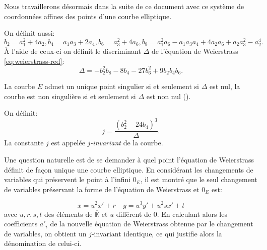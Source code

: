\documentclass[10pt,a4paper]{book}
\theoremstyle{plain}
\theoremstyle{definition}
\theoremstyle{definition}
\theoremstyle{definition}
\theoremstyle{definition}
\theoremstyle{definition}
\newtheorem{defi}[thm]{Définition}
\theoremstyle{remark}
\theoremstyle{remark}
\theoremstyle{definition}
\begin{document}
Nous travaillerons désormais dans la suite de ce document avec ce système de 
coordonnées affines des points d'une courbe elliptique.

 On définit aussi:
\begin{equation*}
b_2=a_1^2+4a_2, b_4=a_1a_3+2a_4, b_6=a_3^2+4a_6, b_8=a_1^2a_6-a_1a_3a_4+4a_2a_6+a_2a_3^2-a_2^4.
\end{equation*}
\`A l'aide de ceux-ci on définit le discriminant $\Delta$ de l'équation de Weierstrass \eqref{eq:weierstrass-red}:
\begin{equation*}
\Delta = -b_2^2b_8-8b_4-27b_6^2+9b_2b_4b_6.
\end{equation*}

La courbe $E$ admet un unique point singulier si et seulement si $\Delta$ est nul, la courbe est non singulière si et seulement si $\Delta$ est non nul (\cite[Prop. III.1.4]{Silv1}).



On définit: 
\begin{equation*}
j=\frac{(b_2^2-24b_4)^3}{\Delta}.
\end{equation*}
La constante $j$ est appelée \emph{$j$-invariant} de la courbe.

Une question naturelle est de se demander à quel point l'équation de 
Weierstrass définit de façon unique une courbe elliptique. En considérant les 
changements de variables qui préservent le point à l'infini $0_E$, il est 
montré \cite[III.3.1b]{Silv1} que le seul changement de variables préservant la
forme de l'équation de Weierstrass et $0_E$ est:

\begin{equation*}
x=u^2x'+r    \quad  y=u^3y'+u^2sx'+t
\end{equation*}
avec $u,r,s,t$ des éléments de $\overline{\mathbb{K}}$ et $u$ différent de $0$. En calculant alors les coefficients $a'_i$ de la nouvelle équation de Weierstrass obtenue par le changement de variables, on obtient un $j$-invariant identique, ce qui justifie alors la dénomination de celui-ci.
\newline
\end{document}

